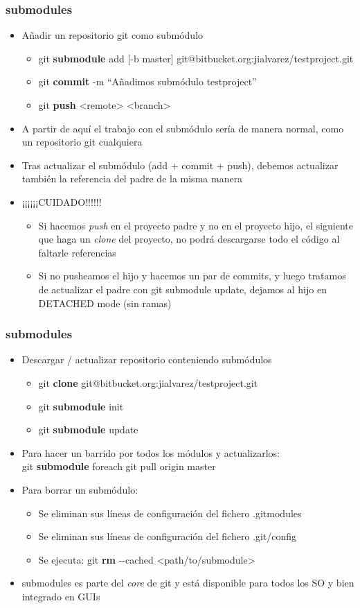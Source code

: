 \frame
{
\frametitle{submodules}
 \begin{itemize}
 \item Añadir un repositorio git como submódulo
  \begin{itemize}
    \item git \textbf{submodule} add [-b master] git@bitbucket.org:jialvarez/testproject.git
    \item git \textbf{commit} -m ``Añadimos submódulo testproject''
    \item git \textbf{push} <remote> <branch>
  \end{itemize}

 \item A partir de aquí el trabajo con el submódulo sería de manera normal, como un repositorio git cualquiera
 \item Tras actualizar el submódulo (add + commit + push), debemos actualizar también la referencia del padre de la misma manera
 \item ¡¡¡¡¡¡CUIDADO!!!!!! 
  \begin{itemize}
    \item Si hacemos \textit{push} en el proyecto padre y no en el proyecto hijo, el siguiente que haga un \textit{clone} del proyecto, no podrá descargarse todo el código al faltarle referencias
    \item Si no pusheamos el hijo y hacemos un par de commits, y luego tratamos de actualizar el padre con git submodule update, dejamos al hijo en DETACHED mode (sin ramas)
  \end{itemize}
 \end{itemize}
}

\frame
{
\frametitle{submodules}
 \begin{itemize}
 \item Descargar / actualizar repositorio conteniendo submódulos
  \begin{itemize}
   \item git \textbf{clone} git@bitbucket.org:jialvarez/testproject.git
   \item git \textbf{submodule} init
   \item git \textbf{submodule} update
  \end{itemize}

 \item Para hacer un barrido por todos los módulos y actualizarlos: \\git \textbf{submodule} foreach git pull origin master
 \item Para borrar un submódulo:
  \begin{itemize}
   \item Se eliminan sus líneas de configuración del fichero .gitmodules
   \item Se eliminan sus líneas de configuración del fichero .git/config
   \item Se ejecuta: git \textbf{rm} -{}-cached <path/to/submodule>
  \end{itemize}

  \item submodules es parte del \textit{core} de git y está disponible para todos los SO y bien integrado en GUIs
 \end{itemize}
}

